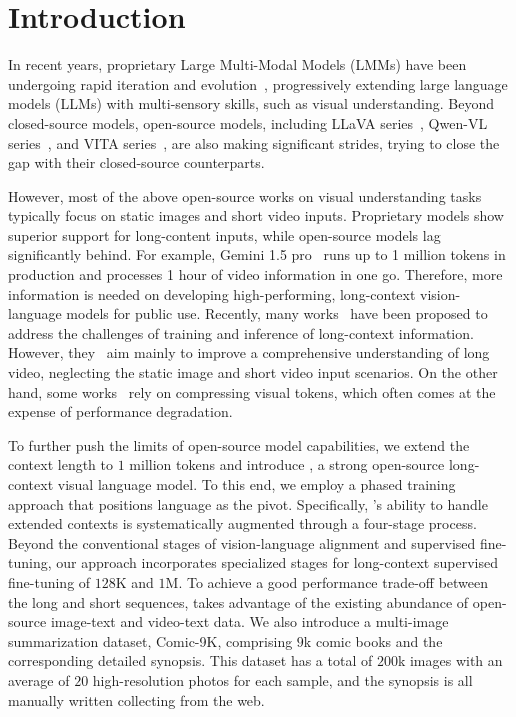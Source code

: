 \section{Introduction}
\label{sec:intro}


%
In recent years, proprietary Large Multi-Modal Models (LMMs) have been undergoing rapid iteration and evolution~\cite{GPT-4,Gemini2.0,Claude3.5}, progressively extending large language models (LLMs) with multi-sensory skills, such as visual understanding.
%
Beyond closed-source models, open-source models, including LLaVA series~\cite{LLaVA-1.5,LLaVA-OneVision}, Qwen-VL series~\cite{Qwen-VL,Qwen2-VL}, and VITA series~\cite{VITA,VITA-1.5}, are also making significant strides, trying to close the gap with their closed-source counterparts.
%




%
However, most of the above open-source works on visual understanding tasks typically focus on static images and short video inputs.
%
Proprietary models show superior support for long-content inputs, while open-source models lag significantly behind.
%
For example,  Gemini 1.5 pro~\cite{Gemini1.5} runs up to 1 million tokens in production and processes 1 hour of video information in one go.
%
Therefore, more information is needed on developing high-performing, long-context vision-language models for public use.
%
Recently, many works~\cite{LongVILA,LongLLaVA,LongVU,LongVA} have been proposed to address the challenges of training and inference of long-context information.
%
However, they~\cite{LongVILA,LongLLaVA} aim mainly to improve a comprehensive understanding of long video, neglecting the static image and short video input scenarios.
%
On the other hand, some works~\cite{SF-LLaVA,LongVU} rely on compressing visual tokens, which often comes at the expense of performance degradation.
%


%
To further push the limits of open-source model capabilities, we extend the context length to $1$ million tokens and introduce \OurMethod, a strong open-source long-context visual language model.
%
To this end, we employ a phased training approach that positions language as the pivot.
%
Specifically, \OurMethod’s ability to handle extended contexts is systematically augmented through a four-stage process.
%
Beyond the conventional stages of vision-language alignment and supervised fine-tuning, our approach incorporates specialized stages for long-context supervised fine-tuning of $128$K and $1$M.
%
To achieve a good performance trade-off between the long and short sequences, \OurMethod takes advantage of the existing abundance of open-source image-text and video-text data.
%
We also introduce a multi-image summarization dataset, Comic-9K, comprising $9$k comic books and the corresponding detailed synopsis.
%
This dataset has a total of $200$k images with an average of $20$ high-resolution photos for each sample, and the synopsis is all manually written collecting from the web.
%





